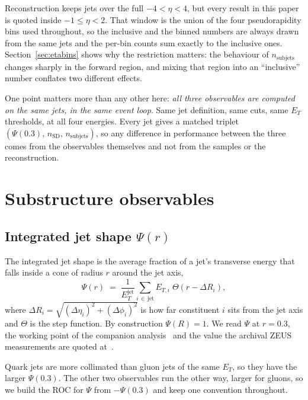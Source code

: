 \documentclass[reprint,amsmath,amssymb,aps,prd,floatfix]{revtex4-2}
\begin{document}
Reconstruction keeps jets over the full $-4 < \eta < 4$, but every result in
this paper is quoted inside $-1 \le \eta < 2$. That window is the union of the
four pseudorapidity bins used throughout, so the inclusive and the binned
numbers are always drawn from the same jets and the per-bin counts sum exactly
to the inclusive ones. Section~\ref{sec:etabins} shows why the restriction
matters: the behaviour of $n_{\mathrm{subjets}}$ changes sharply in the forward
region, and mixing that region into an ``inclusive'' number conflates two
different effects.

One point matters more than any other here: \emph{all three observables are
computed on the same jets, in the same event loop}. Same jet definition, same
cuts, same $E_T$ thresholds, at all four energies. Every jet gives a matched
triplet $(\Psi(0.3),\,n_{\mathrm{SD}},\,n_{\mathrm{subjets}})$, so any
difference in performance between the three comes from the observables
themselves and not from the samples or the reconstruction.

\section{Substructure observables}\label{sec:observables}

\subsection{Integrated jet shape $\Psi(r)$}

The integrated jet shape is the average fraction of a jet's transverse energy
that falls inside a cone of radius $r$ around the jet axis,
\begin{equation}
\Psi(r) \;=\; \frac{1}{E_T^{\mathrm{jet}}}
\sum_{i \,\in\, \mathrm{jet}} E_{T,i}\;\Theta\!\left(r - \Delta R_i\right),
\label{eq:psi}
\end{equation}
where $\Delta R_i = \sqrt{(\Delta\eta_i)^2 + (\Delta\phi_i)^2}$ is how far
constituent $i$ sits from the jet axis and $\Theta$ is the step function. By
construction $\Psi(R) = 1$. We read $\Psi$ at $r = 0.3$, the working point of the
companion analysis~\cite{Singh:2026photo} and the value the archival ZEUS
measurements are quoted
at~\cite{zeus1998measurement,Chekanov_2008,chekanov2008three}.

Quark jets are more collimated than gluon jets of the same $E_T$, so they have
the larger $\Psi(0.3)$. The other two observables run the other way, larger for
gluons, so we build the ROC for $\Psi$ from $-\Psi(0.3)$ and keep one convention
throughout.
\end{document}
